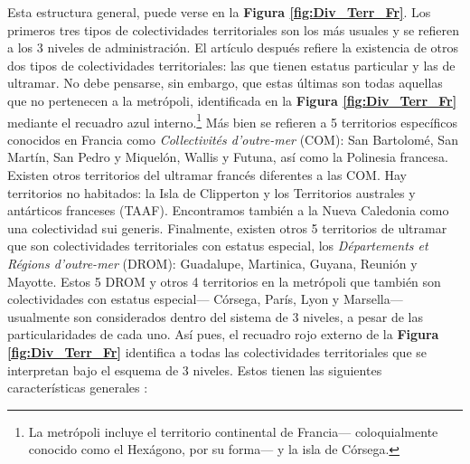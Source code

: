 Esta estructura general, puede verse en la \textbf{Figura \ref{fig:Div_Terr_Fr}}. Los primeros tres tipos de colectividades territoriales son los más usuales y se refieren a los 3 niveles de administración. El artículo después refiere la existencia de otros dos tipos de colectividades territoriales: las que tienen estatus particular y las de ultramar. No debe pensarse, sin embargo, que estas últimas son todas aquellas que no pertenecen a la metrópoli, identificada en la \textbf{Figura \ref{fig:Div_Terr_Fr}} mediante el recuadro azul interno.\footnote{La metrópoli incluye el territorio continental de Francia--- coloquialmente conocido como el Hexágono, por su forma--- y la isla de Córsega.} Más bien se refieren a 5 territorios específicos conocidos en Francia como \textit{Collectivités d'outre-mer} (COM): San Bartolomé, San Martín, San Pedro y Miquelón, Wallis y Futuna, así como la Polinesia francesa. Existen otros territorios del ultramar francés diferentes a las COM. Hay territorios no habitados: la Isla de Clipperton y los Territorios australes y antárticos franceses (TAAF). Encontramos también a la Nueva Caledonia como una colectividad sui generis. Finalmente, existen otros 5 territorios de ultramar que son colectividades territoriales con estatus especial, los \textit{Départements et Régions d'outre-mer} (DROM): Guadalupe, Martinica, Guyana, Reunión y Mayotte. Estos 5 DROM y otros 4 territorios en la metrópoli que también son colectividades con estatus especial--- Córsega, París, Lyon y Marsella--- usualmente son considerados dentro del sistema de 3 niveles, a pesar de las particularidades de cada uno. Así pues, el recuadro rojo externo de la \textbf{Figura \ref{fig:Div_Terr_Fr}} identifica a todas las colectividades territoriales que se interpretan bajo el esquema de 3 niveles. Estos tienen las siguientes características generales \parencite{AN17b}: 


